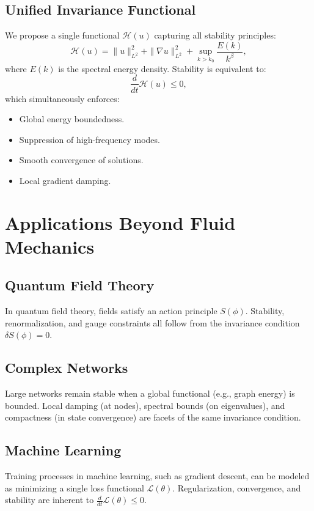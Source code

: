 \documentclass[12pt]{article}
\begin{document}
\subsection{Unified Invariance Functional}
We propose a single functional \(\mathcal{H}(u)\) capturing all stability principles:
\begin{equation}
\mathcal{H}(u) = \|u\|^2_{L^2} + \|\nabla u\|^2_{L^2} + \sup_{k > k_0} \frac{E(k)}{k^\beta},
\end{equation}
where \(E(k)\) is the spectral energy density. Stability is equivalent to:
\begin{equation}
\frac{d}{dt} \mathcal{H}(u) \leq 0,
\end{equation}
which simultaneously enforces:
\begin{itemize}
    \item Global energy boundedness.
    \item Suppression of high-frequency modes.
    \item Smooth convergence of solutions.
    \item Local gradient damping.
\end{itemize}

\section{Applications Beyond Fluid Mechanics}

\subsection{Quantum Field Theory}
In quantum field theory, fields satisfy an action principle \(S(\phi)\). Stability, renormalization, and gauge constraints all follow from the invariance condition \(\delta S(\phi) = 0\).

\subsection{Complex Networks}
Large networks remain stable when a global functional (e.g., graph energy) is bounded. Local damping (at nodes), spectral bounds (on eigenvalues), and compactness (in state convergence) are facets of the same invariance condition.

\subsection{Machine Learning}
Training processes in machine learning, such as gradient descent, can be modeled as minimizing a single loss functional \(\mathcal{L}(\theta)\). Regularization, convergence, and stability are inherent to \(\frac{d}{dt} \mathcal{L}(\theta) \leq 0\).
\end{document}
